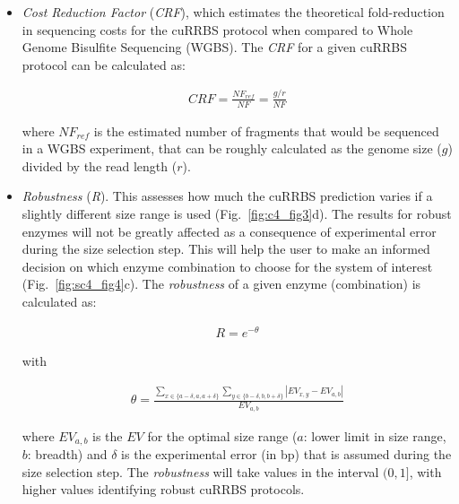 \begin{itemize}

	\item \textit{Cost Reduction Factor} (\textit{CRF}), which estimates the theoretical fold-reduction in sequencing costs for the cuRRBS protocol when compared to Whole Genome Bisulfite Sequencing (WGBS). The \textit{CRF} for a given cuRRBS protocol can be calculated as:
	
	\begin{align}
	CRF = \frac{NF_{ref}}{NF} =  \frac{g/r}{NF}
	\end{align}
	
	where $NF_{ref}$ is the estimated number of fragments that would be sequenced in a WGBS experiment, that can be roughly calculated as the genome size ($g$) divided by the read length ($r$).
	
	\item \textit{Robustness} (\textit{\acrshort{R}}). This assesses how much the cuRRBS prediction varies if a slightly different size range is used (Fig.~\ref{fig:c4_fig3}d). The results for robust enzymes will not be greatly affected as a consequence of experimental error during the size selection step. This will help the user to make an informed decision on which enzyme combination to choose for the system of interest (Fig.~\ref{fig:sc4_fig4}c).	The \textit{robustness} of a given enzyme (combination) is calculated as:
	
	 \begin{align}
	 R = e^{-\theta}	
	 \end{align}
	 
	 with
	 
	 \begin{align}
	 \theta = \frac{\sum_{x\in\{a-\delta,a,a+\delta\}} \sum_{y\in\{b-\delta,b,b+\delta\}} |EV_{x,y} - EV_{a,b}|}{EV_{a,b}}
	 \end{align}
	 
	 where $EV_{a,b}$ is the $EV$ for the optimal size range ($a$: lower limit in size range, $b$: breadth) and $\delta$ is the experimental error (in bp) that is assumed during the size selection step. The \textit{robustness} will take values in the interval $(0,1]$, with higher values identifying robust cuRRBS protocols.
	
\end{itemize}



